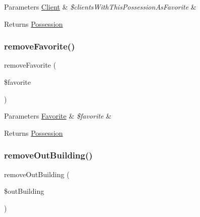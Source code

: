 \begin{DoxyParams}[1]{Parameters}
\mbox{\hyperlink{class_app_1_1_entity_1_1_client}{Client}} & {\em \$clients\+With\+This\+Possession\+As\+Favorite} & \\
\hline
\end{DoxyParams}
\begin{DoxyReturn}{Returns}
\mbox{\hyperlink{class_app_1_1_entity_1_1_possession}{Possession}} 
\end{DoxyReturn}
\mbox{\label{class_app_1_1_entity_1_1_possession_af7ddb0058fa8b93c95254b1435a34f27}} 
\subsubsection{\texorpdfstring{removeFavorite()}{removeFavorite()}}
{\footnotesize\ttfamily remove\+Favorite (\begin{DoxyParamCaption}\item[{\mbox{\hyperlink{class_app_1_1_entity_1_1_favorite}{Favorite}}}]{\$favorite }\end{DoxyParamCaption})}


\begin{DoxyParams}[1]{Parameters}
\mbox{\hyperlink{class_app_1_1_entity_1_1_favorite}{Favorite}} & {\em \$favorite} & \\
\hline
\end{DoxyParams}
\begin{DoxyReturn}{Returns}
\mbox{\hyperlink{class_app_1_1_entity_1_1_possession}{Possession}} 
\end{DoxyReturn}
\mbox{\label{class_app_1_1_entity_1_1_possession_ad36d98ddaebdf108070c32b6ef6b8668}} 
\subsubsection{\texorpdfstring{removeOutBuilding()}{removeOutBuilding()}}
{\footnotesize\ttfamily remove\+Out\+Building (\begin{DoxyParamCaption}\item[{\mbox{\hyperlink{class_app_1_1_entity_1_1_out_building}{Out\+Building}}}]{\$out\+Building }\end{DoxyParamCaption})}


